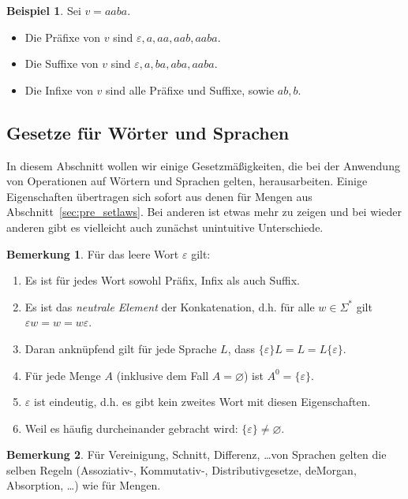 \documentclass[11pt, a4paper]{article}
\theoremstyle{definition}
\newtheorem{example}[definition]{Beispiel}
\newtheorem*{remark*}{Bemerkung}
\theoremstyle{plain}
\numberwithin{equation}{section}
\let\emptyset\varnothing
\begin{document}
\begin{example}
	Sei \( v = aaba \).
	\begin{itemize}
		\item Die Präfixe von \( v \) sind \( \varepsilon, a, aa, aab, aaba \).
		\item Die Suffixe von \( v \) sind \( \varepsilon, a, ba, aba, aaba \).
		\item Die Infixe von \( v \) sind alle Präfixe und Suffixe, sowie \( ab, b \).
	\end{itemize}
\end{example}


\subsection{Gesetze für Wörter und Sprachen}\label{sec:awl_wordlaws}
In diesem Abschnitt wollen wir einige Gesetzmäßigkeiten, die bei der Anwendung von Operationen auf Wörtern und Sprachen gelten, herausarbeiten. Einige Eigenschaften übertragen sich sofort aus denen für Mengen aus Abschnitt~\ref{sec:pre_setlaws}. Bei anderen ist etwas mehr zu zeigen und bei wieder anderen gibt es vielleicht auch zunächst unintuitive Unterschiede.
\begin{remark*}
	Für das leere Wort \( \varepsilon \) gilt:
	\begin{enumerate}
		\item Es ist für jedes Wort sowohl Präfix, Infix als auch Suffix.
		\item Es ist das \textit{neutrale Element} der Konkatenation, d.h. für alle \( w \in \Sigma^\ast \) gilt \( \varepsilon w = w = w \varepsilon \).
		\item Daran anknüpfend gilt für jede Sprache \( L \), dass \(  \{ \varepsilon \} L = L = L  \{ \varepsilon \} \).
		\item Für jede Menge \( A \) (inklusive dem Fall \( A = \emptyset \)) ist \( A^0 = \{ \varepsilon \} \).
		\item \( \varepsilon \) ist eindeutig, d.h. es gibt kein zweites Wort mit diesen Eigenschaften.
		\item Weil es häufig durcheinander gebracht wird: \( \{ \varepsilon \} \neq \emptyset \).
	\end{enumerate}
\end{remark*}

\begin{remark*}
	Für Vereinigung, Schnitt, Differenz, \ldots von Sprachen gelten die selben Regeln (Assoziativ-, Kommutativ-, Distributivgesetze, deMorgan, Absorption, \ldots) wie für Mengen.
\end{remark*}
\end{document}
